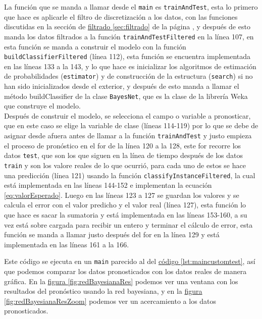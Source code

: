 La función que se manda a llamar desde el \texttt{main} es \texttt{trainAndTest}, esta lo primero que hace es aplicarle el filtro de discretización a los datos, con las funciones discutidas en la sección de \hyperref[sec:filtrado]{ filtrado \ref{sec:filtrado}} de la página \pageref{sec:filtrado}, y después de esto manda los datos filtrados a la función \texttt{trainAndTestFiltered} en la línea 107, en esta función se manda a construir el modelo con la función \texttt{buildClassifierFiltered} (línea 112), esta función se encuentra implementada en las líneas 133 a la 143, y lo que hace es inicializar los algoritmos de estimación de probabilidades (\texttt{estimator}) y de construcción de la estructura (\texttt{search}) si no han sido inicializados desde el exterior, y después de esto manda a llamar el método buildClassifier de la clase \texttt{BayesNet}, que es la clase de la librería Weka que construye el modelo.\\
Después de construir el modelo, se selecciona el campo o variable a pronosticar, que en este caso se elige la variable de clase (líneas 114-119) por lo que se debe de asignar desde afuera antes de llamar a la función \texttt{trainAndTest} y justo empieza el proceso de pronóstico en el for de la línea 120 a la 128, este for recorre los datos \texttt{test}, que son los que siguen en la línea de tiempo después de los datos \texttt{train} y son los valore reales de lo que ocurrió, para cada uno de estos se hace una predicción (línea 121) usando la función \texttt{classifyInstanceFiltered}, la cual está implementada en las líneas 144-152 e implementan la ecuación \ref{eq:valorEsperado}. Luego en las líneas 123 a 127 se guardan los valores y se calcula el error con el valor predicho y el valor real (línea 127), esta función lo que hace es sacar la sumatoria y está implementada en las líneas 153-160, a su vez está sobre cargada para recibir un entero y terminar el cálculo de error, esta función se manda a llamar justo después del for en la línea 129 y está implementada en las líneas 161 a la 166.

Este código se ejecuta en un \texttt{main} parecido al del \hyperref[lst:maincustomtest]{ código \ref{lst:maincustomtest}}, así que podemos comparar los datos pronosticados con los datos reales de manera gráfica. En la  \hyperref[fig:redBayesianaRes]{ figura \ref{fig:redBayesianaRes}} podemos ver una ventana con los resultados del pronóstico usando la red bayesiana, y en la \hyperref[fig:redBayesianaResZoom]{ figura \ref{fig:redBayesianaResZoom}} podemos ver un acercamiento a los datos pronosticados.

